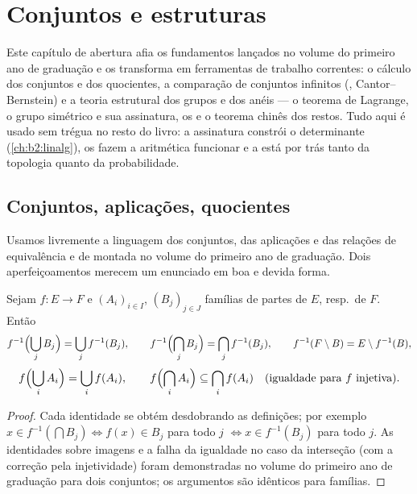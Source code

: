 \chapter{Conjuntos e estruturas}\label{ch:b2:structures}

Este capítulo de abertura afia os fundamentos lançados no volume do
primeiro ano de graduação e os transforma em ferramentas de trabalho
correntes: o cálculo dos conjuntos e dos quocientes, a comparação de
conjuntos infinitos (,
Cantor--Bernstein) e a teoria estrutural dos grupos e dos anéis ---
o teorema de Lagrange, o grupo simétrico e sua assinatura, os
 e o teorema chinês dos restos. Tudo aqui é usado sem
trégua no resto do livro: a assinatura constrói o determinante
(\cref{ch:b2:linalg}), os  fazem a aritmética funcionar e a
 está por trás tanto da topologia quanto da probabilidade.

\section{Conjuntos, aplicações, quocientes}

Usamos livremente a linguagem dos conjuntos, das aplicações e das
relações de equivalência e de  montada no volume do primeiro ano
de graduação. Dois aperfeiçoamentos merecem um enunciado em boa e
devida forma.

\begin{proposition}\label{prop:b2:structures:images}
Sejam $f \colon E \to F$ e $(A_i)_{i \in I}$, $(B_j)_{j \in J}$
famílias de partes de $E$, resp.\ de $F$. Então
\[
f^{-1}\Bigl(\bigcup_j B_j\Bigr) = \bigcup_j f^{-1}(B_j),
\qquad
f^{-1}\Bigl(\bigcap_j B_j\Bigr) = \bigcap_j f^{-1}(B_j),
\qquad
f^{-1}(F \setminus B) = E \setminus f^{-1}(B),
\]
\[
f\Bigl(\bigcup_i A_i\Bigr) = \bigcup_i f(A_i),
\qquad
f\Bigl(\bigcap_i A_i\Bigr) \subseteq \bigcap_i f(A_i)
\quad (\text{igualdade para } f \text{ injetiva}).
\]
\end{proposition}

\begin{proof}
Cada identidade se obtém desdobrando as definições; por exemplo $x \in
f^{-1}(\bigcap B_j) \iff f(x) \in B_j$ para todo $j$ $\iff x \in
f^{-1}(B_j)$ para todo $j$. As identidades sobre imagens e a falha da
igualdade no caso da interseção (com a correção pela injetividade)
foram demonstradas no volume do primeiro ano de graduação para dois
conjuntos; os argumentos são idênticos para famílias.
\end{proof}

